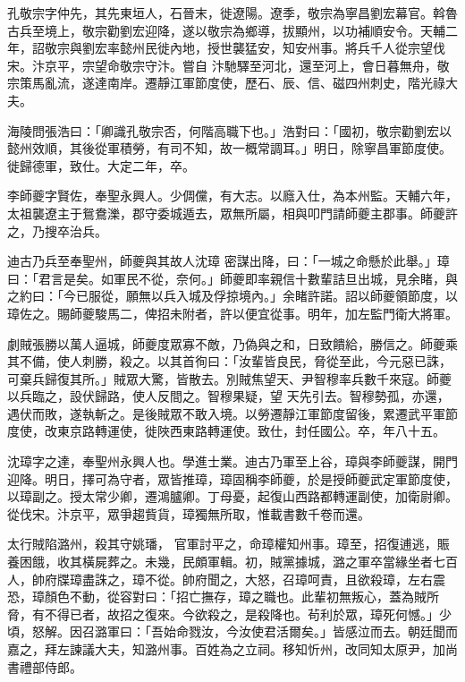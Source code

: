 \begin{pinyinscope}
 孔敬宗字仲先，其先東垣人，石晉末，徙遼陽。遼季，敬宗為寧昌劉宏幕官。斡魯古兵至境上，敬宗勸劉宏迎降，遂以敬宗為鄉導，拔顯州，以功補順安令。天輔二年，詔敬宗與劉宏率懿州民徙內地，授世襲猛安，知安州事。將兵千人從宗望伐宋。汴京平，宗望命敬宗守汴。嘗自
 汴馳驛至河北，還至河上，會日暮無舟，敬宗策馬亂流，遂達南岸。遷靜江軍節度使，歷石、辰、信、磁四州刺史，階光祿大夫。



 海陵問張浩曰：「卿識孔敬宗否，何階高職下也。」浩對曰：「國初，敬宗勸劉宏以懿州效順，其後從軍積勞，有司不知，故一概常調耳。」明日，除寧昌軍節度使。徙歸德軍，致仕。大定二年，卒。



 李師夔字賢佐，奉聖永興人。少倜儻，有大志。以廕入仕，為本州監。天輔六年，太祖襲遼主于鴛鴦濼，郡守委城遁去，眾無所屬，相與叩門請師夔主郡事。師夔許之，乃搜卒治兵。



 迪古乃兵至奉聖州，師夔與其故人沈璋
 密謀出降，曰：「一城之命懸於此舉。」璋曰：「君言是矣。如軍民不從，奈何。」師夔即率親信十數輩詰旦出城，見余睹，與之約曰：「今已服從，願無以兵入城及俘掠境內。」余睹許諾。詔以師夔領節度，以璋佐之。賜師夔駿馬二，俾招未附者，許以便宜從事。明年，加左監門衛大將軍。



 劇賊張勝以萬人逼城，師夔度眾寡不敵，乃偽與之和，日致饋給，勝信之。師夔乘其不備，使人刺勝，殺之。以其首徇曰：「汝輩皆良民，脅從至此，今元惡已誅，可棄兵歸復其所。」賊眾大驚，皆散去。別賊焦望天、尹智穆率兵數千來寇。師夔以兵臨之，設伏歸路，使人反間之。智穆果疑，望
 天先引去。智穆勢孤，亦還，遇伏而敗，遂執斬之。是後賊眾不敢入境。以勞遷靜江軍節度留後，累遷武平軍節度使，改東京路轉運使，徙陜西東路轉運使。致仕，封任國公。卒，年八十五。



 沈璋字之達，奉聖州永興人也。學進士業。迪古乃軍至上谷，璋與李師夔謀，開門迎降。明日，擇可為守者，眾皆推璋，璋固稱李師夔，於是授師夔武定軍節度使，以璋副之。授太常少卿，遷鴻臚卿。丁母憂，起復山西路都轉運副使，加衛尉卿。從伐宋。汴京平，眾爭趨貲貨，璋獨無所取，惟載書數千卷而還。



 太行賊陷潞州，殺其守姚璠，
 官軍討平之，命璋權知州事。璋至，招復逋逃，賑養困餓，收其橫屍葬之。未幾，民頗軍輯。初，賊黨據城，潞之軍卒當緣坐者七百人，帥府牒璋盡誅之，璋不從。帥府聞之，大怒，召璋呵責，且欲殺璋，左右震恐，璋顏色不動，從容對曰：「招亡撫存，璋之職也。此輩初無叛心，蓋為賊所脅，有不得已者，故招之復來。今欲殺之，是殺降也。茍利於眾，璋死何憾。」少頃，怒解。因召潞軍曰：「吾始命戮汝，今汝使君活爾矣。」皆感泣而去。朝廷聞而嘉之，拜左諫議大夫，知潞州事。百姓為之立祠。移知忻州，改同知太原尹，加尚書禮部侍郎。




\end{pinyinscope}
